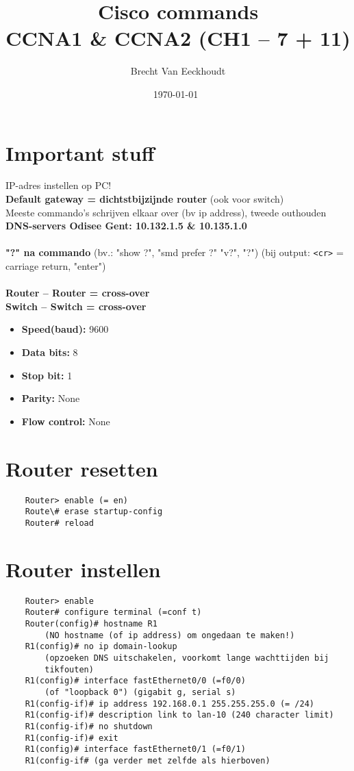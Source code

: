 \documentclass[10pt, a4paper]{article}
\title{Cisco commands \\CCNA1 \& CCNA2 (CH1 -- 7 + 11)}
\author{Brecht Van Eeckhoudt}
\date{\today \ \currenttime}
\begin{document}
	\maketitle

	\section{Important stuff}
	IP-adres instellen op PC!\\
	\textbf{Default gateway = dichtstbijzijnde router }(ook voor switch)\\
	Meeste commando's schrijven elkaar over (bv ip address), tweede outhouden\\
	\textbf{DNS-servers Odisee Gent: 10.132.1.5 \& 10.135.1.0}\\ \\
	\textbf{"?" na commando} (bv.: "show ?", "smd prefer ?" "v?", "?") (bij output: \texttt{<cr>} = carriage return, "enter")\\ \\
	\textbf{Router -- Router = cross-over}\\
	\textbf{Switch -- Switch = cross-over}\\
	\begin{itemize}[noitemsep,nolistsep]
		\item \textbf{Speed(baud):} 9600
		\item \textbf{Data bits:} 8
		\item \textbf{Stop bit:} 1
		\item \textbf{Parity:} None
		\item \textbf{Flow control:} None\\
	\end{itemize}

	\section{Router resetten}
	\begin{lstlisting}
	Router> enable (= en)
	Route\# erase startup-config
	Router# reload
	\end{lstlisting}

	\section{Router instellen}
	\begin{lstlisting}
	Router> enable
	Router# configure terminal (=conf t)
	Router(config)# hostname R1
		(NO hostname (of ip address) om ongedaan te maken!)
	R1(config)# no ip domain-lookup
		(opzoeken DNS uitschakelen, voorkomt lange wachttijden bij
		tikfouten)
	R1(config)# interface fastEthernet0/0 (=f0/0)
		(of "loopback 0") (gigabit g, serial s)
	R1(config-if)# ip address 192.168.0.1 255.255.255.0 (= /24)
	R1(config-if)# description link to lan-10 (240 character limit)
	R1(config-if)# no shutdown
	R1(config-if)# exit
	R1(config)# interface fastEthernet0/1 (=f0/1)
	R1(config-if# (ga verder met zelfde als hierboven)
	\end{lstlisting}
\end{document}
